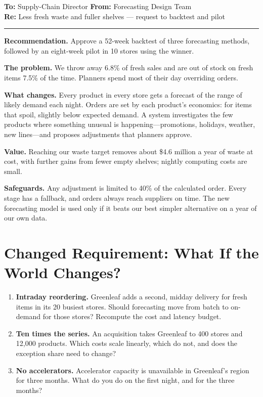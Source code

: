 \begin{tcolorbox}[colback=white, colframe=black!60, boxrule=0.6pt, arc=1pt, left=10pt, right=10pt, top=8pt, bottom=8pt, fontupper=\small]
\textbf{To:} Supply-Chain Director \hfill \textbf{From:} Forecasting Design Team\\
\textbf{Re:} Less fresh waste and fuller shelves --- request to backtest and pilot

\smallskip\hrule\smallskip

\textbf{Recommendation.} Approve a 52-week backtest of three forecasting methods, followed by an eight-week pilot in 10 stores using the winner.

\textbf{The problem.} We throw away 6.8\% of fresh sales and are out of stock on fresh items 7.5\% of the time. Planners spend most of their day overriding orders.

\textbf{What changes.} Every product in every store gets a forecast of the range of likely demand each night. Orders are set by each product's economics: for items that spoil, slightly below expected demand. A system investigates the few products where something unusual is happening---promotions, holidays, weather, new lines---and proposes adjustments that planners approve.

\textbf{Value.} Reaching our waste target removes about \$4.6 million a year of waste at cost, with further gains from fewer empty shelves; nightly computing costs are small.

\textbf{Safeguards.} Any adjustment is limited to 40\% of the calculated order. Every stage has a fallback, and orders always reach suppliers on time. The new forecasting model is used only if it beats our best simpler alternative on a year of our own data.
\end{tcolorbox}

\section{Changed Requirement: What If the World Changes?}
\label{sec:fc-changed}

\begin{enumerate}[itemsep=3pt]
  \item \textbf{Intraday reordering.} Greenleaf adds a second, midday delivery for fresh items in its 20 busiest stores. Should forecasting move from batch to on-demand for those stores? Recompute the cost and latency budget.
  \item \textbf{Ten times the series.} An acquisition takes Greenleaf to 400 stores and 12{,}000 products. Which costs scale linearly, which do not, and does the exception share need to change?
  \item \textbf{No accelerators.} Accelerator capacity is unavailable in Greenleaf's region for three months. What do you do on the first night, and for the three months?
\end{enumerate}

